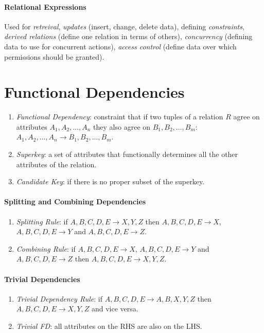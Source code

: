 \documentclass[twocolumn,english]{article}
\begin{document}
\paragraph{Relational Expressions}

Used for \emph{retreival}, \emph{updates} (insert, change, delete
data), defining \emph{constraints}, \emph{derived relations} (define
one relation in terms of others), \emph{concurrency} (defining data
to use for concurrent actions), \emph{access control} (define data
over which permissions should be granted).


\section{Functional Dependencies}
\begin{enumerate}
\item \emph{Functional Dependency}: constraint that if two tuples of a relation
$R$ agree on attributes $A_{1},A_{2},\dots,A_{n}$ they also agree
on $B_{1},B_{2},\dots,B_{m}$: $A_{1},A_{2},\dots,A_{n}\rightarrow B_{1},B_{2},\dots,B_{m}$.
\item \emph{Superkey}: a set of attributes that functionally determines
all the other attributes of the relation.
\item \emph{Candidate Key}: if there is no proper subset of the superkey.
\end{enumerate}

\paragraph{Splitting and Combining Dependencies}
\begin{enumerate}
\item \emph{Splitting Rule}: if $A,B,C,D,E\rightarrow X,Y,Z$ then $A,B,C,D,E\rightarrow X$,
$A,B,C,D,E\rightarrow Y$ and $A,B,C,D,E\rightarrow Z$.
\item \emph{Combining Rule}: if $A,B,C,D,E\rightarrow X$, $A,B,C,D,E\rightarrow Y$
and $A,B,C,D,E\rightarrow Z$ then $A,B,C,D,E\rightarrow X,Y,Z$.
\end{enumerate}

\paragraph{Trivial Dependencies}
\begin{enumerate}
\item \emph{Trivial Dependency Rule}: if $A,B,C,D,E\rightarrow A,B,X,Y,Z$
then $A,B,C,D,E\rightarrow X,Y,Z$ and vice versa.
\item \emph{Trivial FD}: all attributes on the RHS are also on the LHS.
\end{enumerate}
\end{document}
